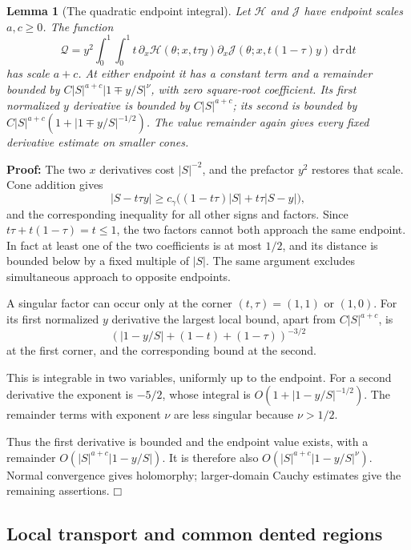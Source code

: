 \documentclass[a4paper,10pt]{article}
\numberwithin{equation}{section}
\newcommand{\dd}{\mathrm{d}}
\theoremstyle{paperplain}
\newtheorem{lmm}[thm]{Lemma}
\theoremstyle{paperremark}
\theoremstyle{paperplain}
\newenvironment{prf}{\noindent \textbf{Proof: }}{\hfill $\mdlgwhtsquare$\par\addvspace{0.5\baselineskip}}
\begin{document}
\begin{lmm}[The quadratic endpoint integral]\label{lmm:b:quadratic-endpoint}
Let $\mathcal H$ and $\mathcal J$ have endpoint scales $a,c\geq0$.
The function
\begin{equation}\label{eq:b:quadratic-input}
 \mathcal Q=y^2\int_0^1\int_0^1
 t\,\partial_x\mathcal H(\theta;x,t\tau y)
       \partial_x\mathcal J(\theta;x,t(1-\tau)y)
                              \,\dd\tau\,\dd t
\end{equation}
has scale $a+c$. At either endpoint it has a constant term and
a remainder bounded by $C|S|^{a+c}|1\mp y/S|^\nu$, with zero
square-root coefficient. Its first normalized $y$ derivative is
bounded by $C|S|^{a+c}$; its second is bounded by
$C|S|^{a+c}(1+|1\mp y/S|^{-1/2})$.
The value remainder again gives every fixed derivative estimate
on smaller cones.
\end{lmm}
\begin{prf}
The two $x$ derivatives cost $|S|^{-2}$, and the prefactor $y^2$
restores that scale. Cone addition gives
\[
 |S-t\tau y|\geq c_\gamma
       \bigl((1-t\tau)|S|+t\tau|S-y|\bigr),
\]
and the corresponding inequality for all other signs and factors.
Since $t\tau+t(1-\tau)=t\leq1$, the two factors cannot both
approach the same endpoint. In fact at least one of the two
coefficients is at most $1/2$, and its distance is bounded below
by a fixed multiple of $|S|$. The same argument excludes
simultaneous approach to opposite endpoints.

A singular factor can occur only at the corner $(t,\tau)=(1,1)$
or $(1,0)$. For its first normalized $y$ derivative the largest
local bound, apart from $C|S|^{a+c}$, is
\[
 (|1-y/S|+(1-t)+(1-\tau))^{-3/2}
\]
at the first corner, and the corresponding bound at the second.

This is integrable in two variables, uniformly up to the endpoint.
For a second derivative the exponent is $-5/2$, whose integral is
$O(1+|1-y/S|^{-1/2})$. The remainder terms with exponent $\nu$
are less singular because $\nu>1/2$.

Thus the first derivative
is bounded and the endpoint value exists, with a remainder
$O(|S|^{a+c}|1-y/S|)$. It is therefore also $O(|S|^{a+c}|1-y/S|^\nu)$.
Normal convergence gives holomorphy; larger-domain Cauchy estimates
give the remaining assertions.
\end{prf}

\subsection{Local transport and common dented regions}
\label{subsec:b:local-transport}
\end{document}
